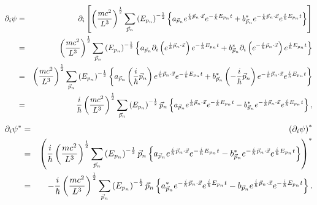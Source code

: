 \begin{eqnarray*}
\partial _{i}\psi  &=&\partial _{i}\left[ \left( \frac{mc^{2}}{L^{3}}\right)
^{\frac{1}{2}}\sum_{\vec{p}_{n}}\left( E_{p_{n}}\right) ^{-\frac{1}{2}%
}\left\{ a_{\vec{p}_{n}}e^{\frac{i}{\hbar }\vec{p}_{n}\cdot \vec{x}}e^{-%
\frac{i}{\hbar }E_{p_{n}}t}+b_{\vec{p}_{n}}^{\ast }e^{-\frac{i}{\hbar }\vec{p%
}_{n}\cdot \vec{x}}e^{\frac{i}{\hbar }E_{p_{n}}t}\right\} \right]  \\
&=&\left( \frac{mc^{2}}{L^{3}}\right) ^{\frac{1}{2}}\sum_{\vec{p}_{n}}\left(
E_{p_{n}}\right) ^{-\frac{1}{2}}\left\{ a_{\vec{p}_{n}}\partial _{i}\left(
e^{\frac{i}{\hbar }\vec{p}_{n}\cdot \vec{x}}\right) e^{-\frac{i}{\hbar }%
E_{p_{n}}t}+b_{\vec{p}_{n}}^{\ast }\partial _{i}\left( e^{-\frac{i}{\hbar }%
\vec{p}_{n}\cdot \vec{x}}\right) e^{\frac{i}{\hbar }E_{p_{n}}t}\right\}  \\
&=&\left( \frac{mc^{2}}{L^{3}}\right) ^{\frac{1}{2}}\sum_{\vec{p}_{n}}\left(
E_{p_{n}}\right) ^{-\frac{1}{2}}\left\{ a_{\vec{p}_{n}}\left( \frac{i}{\hbar 
}\vec{p}_{n}\right) e^{\frac{i}{\hbar }\vec{p}_{n}\cdot \vec{x}}e^{-\frac{i}{%
\hbar }E_{p_{n}}t}+b_{\vec{p}_{n}}^{\ast }\left( -\frac{i}{\hbar }\vec{p}%
_{n}\right) e^{-\frac{i}{\hbar }\vec{p}_{n}\cdot \vec{x}}e^{\frac{i}{\hbar }%
E_{p_{n}}t}\right\}  \\
&=&\frac{i}{\hbar }\left( \frac{mc^{2}}{L^{3}}\right) ^{\frac{1}{2}}\sum_{%
\vec{p}_{n}}\left( E_{p_{n}}\right) ^{-\frac{1}{2}}\vec{p}_{n}\left\{ a_{%
\vec{p}_{n}}e^{\frac{i}{\hbar }\vec{p}_{n}\cdot \vec{x}}e^{-\frac{i}{\hbar }%
E_{p_{n}}t}-b_{\vec{p}_{n}}^{\ast }e^{-\frac{i}{\hbar }\vec{p}_{n}\cdot \vec{%
x}}e^{\frac{i}{\hbar }E_{p_{n}}t}\right\} ,
\end{eqnarray*}%
\begin{eqnarray*}
\partial _{i}\psi ^{\ast } &=&\left( \partial _{i}\psi \right) ^{\ast } \\
&=&\left( \frac{i}{\hbar }\left( \frac{mc^{2}}{L^{3}}\right) ^{\frac{1}{2}%
}\sum_{\vec{p}_{n}}\left( E_{p_{n}}\right) ^{-\frac{1}{2}}\vec{p}_{n}\left\{
a_{\vec{p}_{n}}e^{\frac{i}{\hbar }\vec{p}_{n}\cdot \vec{x}}e^{-\frac{i}{%
\hbar }E_{p_{n}}t}-b_{\vec{p}_{n}}^{\ast }e^{-\frac{i}{\hbar }\vec{p}%
_{n}\cdot \vec{x}}e^{\frac{i}{\hbar }E_{p_{n}}t}\right\} \right) ^{\ast } \\
&=&-\frac{i}{\hbar }\left( \frac{mc^{2}}{L^{3}}\right) ^{\frac{1}{2}}\sum_{%
\vec{p}_{n}}\left( E_{p_{n}}\right) ^{-\frac{1}{2}}\vec{p}_{n}\left\{ a_{%
\vec{p}_{n}}^{\ast }e^{-\frac{i}{\hbar }\vec{p}_{n}\cdot \vec{x}}e^{\frac{i}{%
\hbar }E_{p_{n}}t}-b_{\vec{p}_{n}}e^{\frac{i}{\hbar }\vec{p}_{n}\cdot \vec{x}%
}e^{-\frac{i}{\hbar }E_{p_{n}}t}\right\} .
\end{eqnarray*}%
